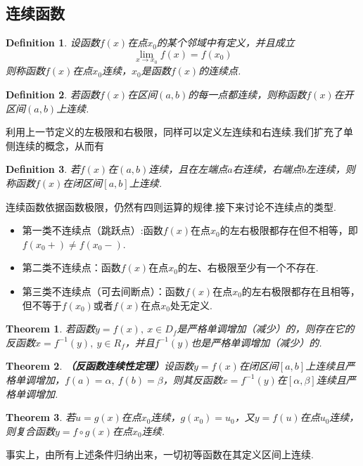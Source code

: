 \documentclass[9pt]{ctexart}
\newtheorem{definition}{Definition}[section]
\newtheorem{theorem}{Theorem}[section]
\begin{document}
\subsection{连续函数}
\begin{definition}
    设函数$f(x)$在点$x_0$的某个邻域中有定义，并且成立
    \[\lim_{x\to x_0}f(x)=f(x_0)\]
    则称函数$f(x)$在点$x_0$连续，$x_0$是函数$f(x)$的连续点.
\end{definition}

\begin{definition}
    若函数$f(x)$在区间$(a,b)$的每一点都连续，则称函数$f(x)$在开区间$(a,b)$上连续.
\end{definition}

\par{利用上一节定义的左极限和右极限，同样可以定义左连续和右连续.我们扩充了单侧连续的概念，从而有}
\begin{definition}
    若$f(x)$在$(a,b)$连续，且在左端点$a$右连续，右端点$b$左连续，则称函数$f(x)$在闭区间$[a,b]$上连续.
\end{definition}
\par{连续函数依据函数极限，仍然有四则运算的规律.接下来讨论不连续点的类型.}
\begin{itemize}
    \item[（1）] 第一类不连续点（跳跃点）:函数$f(x)$在点$x_0$的左右极限都存在但不相等，即$f(x_0+)\neq f(x_0-)$.
    \item[（2）] 第二类不连续点：函数$f(x)$在点$x_0$的左、右极限至少有一个不存在.
    \item[（3）] 第三类不连续点（可去间断点）：函数$f(x)$在点$x_0$的左右极限都存在且相等，但不等于$f(x_0)$或者$f(x)$在点$x_0$处无定义.
\end{itemize}

\begin{theorem}
    若函数$y=f(x),\ x\in D_f$是严格单调增加（减少）的，则存在它的反函数$x=f^{-1}(y),\ y\in R_f$，并且$f^{-1}(y)$也是严格单调增加（减少）的.
\end{theorem}

\begin{theorem}
    \textbf{（反函数连续性定理）}设函数$y=f(x)$在闭区间$[a,b]$上连续且严格单调增加，$f(a)=\alpha,\ f(b)=\beta$，则其反函数$x=f^{-1}(y)$在$[\alpha,\beta]$连续且严格单调增加.
\end{theorem}

\begin{theorem}
    若$u=g(x)$在点$x_0$连续，$g(x_0)=u_0$，又$y=f(u)$在点$u_0$连续，则复合函数$y=f\circ g(x)$在点$x_0$连续.
\end{theorem}
\par{事实上，由所有上述条件归纳出来，一切初等函数在其定义区间上连续.}
\end{document}
